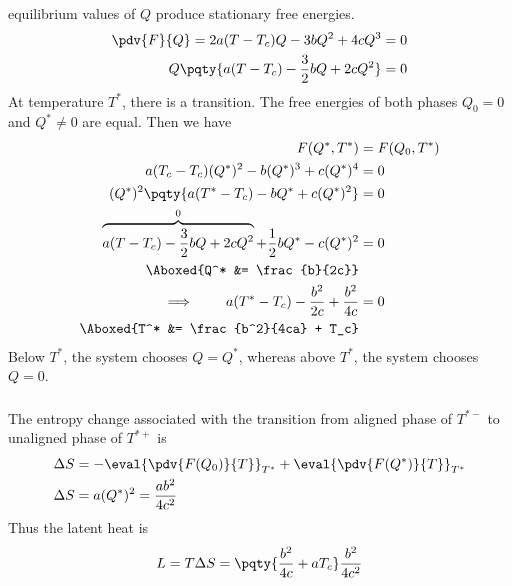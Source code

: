 \documentclass[12pt]{article}
\begin{document}
     \subsubsection{} equilibrium values of \(Q\) produce stationary free energies. \begin{align*}
        \pdv{F}{Q} = 2a(T - T_c)Q - 3bQ^2 + 4cQ^3 &=  0\\
        Q \pqty{a(T - T_c) - \frac{3}{2}bQ + 2cQ^2} &= 0
    \end{align*}
    At temperature \(T^*\), there is a transition. The free energies of both phases \(Q_0 = 0\) and \(Q^*\neq 0\) are equal. Then we have \begin{align*}
        F(Q^*, T^*) &= F(Q_0, T^*)\\
        a(T_c - T_c)(Q^*)^2 - b(Q^*)^3 + c(Q^*)^4 &=  0\\
        (Q^*)^2\pqty{a(T^* - T_c) - bQ^* + c(Q^*)^2} &=  0\\
        \overbrace{a(T - T_c) - \frac{3}{2}bQ + 2cQ^2}^0 + \frac{1}{2}bQ^* - c(Q^*)^2 &= 0\\
        \Aboxed{Q^* &= \frac{b}{2c}}\\
        \implies \qquad a(T^* - T_c) - \frac{b^2}{2c} + \frac{b^2}{4c} &= 0\\
        \Aboxed{T^* &=  \frac{b^2}{4ca} + T_c}
    \end{align*}
    Below \(T^*\), the system chooses \(Q = Q^*\), whereas above \(T^*\), the system chooses \(Q = 0\).
     \subsubsection{} The entropy change associated with the transition from aligned phase of \(T^{* -}\) to unaligned phase of \(T^{* +}\) is \begin{align*}
        \Delta S &= -\eval{ \pdv{F(Q_0)}{T}}_{T^*} + \eval{ \pdv{F(Q^*)}{T}}_{T^*}\\
        \Delta S &= a(Q^*)^2 = \frac{a b^2}{4c^2} 
    \end{align*}
    Thus the latent heat is \[
        L = T\Delta S = \pqty{\frac{b^2}{4c} + aT_c} \frac{b^2}{4c^2} 
    \]
\end{document}
